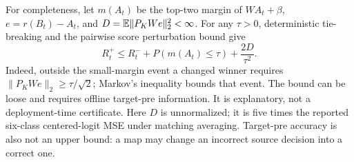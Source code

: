 For completeness, let $m(A_t)$ be the top-two margin of $WA_t+\beta$, $e=r(B_t)-A_t$, and $D=\mathbb{E}\|P_KWe\|_2^2<\infty$. For any $\tau>0$, deterministic tie-breaking and the pairwise score perturbation bound give
\begin{equation}
 R_t^+\le R_t^-+P(m(A_t)\le\tau)+\frac{2D}{\tau^2}.\label{eq:margin}
\end{equation}
Indeed, outside the small-margin event a changed winner requires $\|P_KWe\|_2\ge\tau/\sqrt2$; Markov's inequality bounds that event. The bound can be loose and requires offline target-pre information. It is explanatory, not a deployment-time certificate. Here $D$ is unnormalized; it is five times the reported six-class centered-logit MSE under matching averaging. Target-pre accuracy is also not an upper bound: a map may change an incorrect source decision into a correct one.
